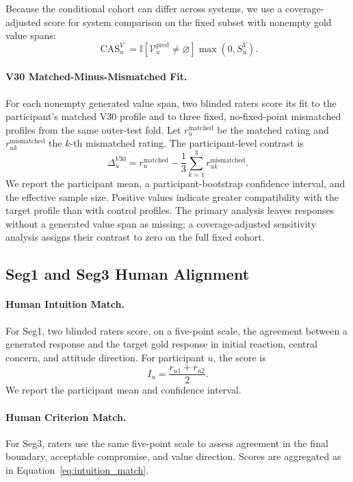 Because the conditional cohort can differ across systems, we use a coverage-adjusted score for system comparison on the fixed subset with nonempty gold value spans:
\begin{equation}
\operatorname{CAS}_u^V=
\mathbb I[\mathcal V_u^{\mathrm{pred}}\ne\varnothing]
\max(0,S_u^V).
\label{eq:coverage_adjusted_value}
\end{equation}

\paragraph{V30 Matched-Minus-Mismatched Fit.}
For each nonempty generated value span, two blinded raters score its fit to the participant's matched V30 profile and to three fixed, no-fixed-point mismatched profiles from the same outer-test fold. Let $r_u^{\mathrm{matched}}$ be the matched rating and $r_{uk}^{\mathrm{mismatched}}$ the $k$-th mismatched rating. The participant-level contrast is
\begin{equation}
\Delta_u^{V30}
=r_u^{\mathrm{matched}}
-\frac{1}{3}\sum_{k=1}^{3}r_{uk}^{\mathrm{mismatched}}.
\label{eq:v30_matched_margin}
\end{equation}
We report the participant mean, a participant-bootstrap confidence interval, and the effective sample size. Positive values indicate greater compatibility with the target profile than with control profiles. The primary analysis leaves responses without a generated value span as missing; a coverage-adjusted sensitivity analysis assigns their contrast to zero on the full fixed cohort.

\subsection{Seg1 and Seg3 Human Alignment}

\paragraph{Human Intuition Match.}
For Seg1, two blinded raters score, on a five-point scale, the agreement between a generated response and the target gold response in initial reaction, central concern, and attitude direction. For participant $u$, the score is
\begin{equation}
I_u=\frac{r_{u1}+r_{u2}}{2}.
\label{eq:intuition_match}
\end{equation}
We report the participant mean and confidence interval.

\paragraph{Human Criterion Match.}
For Seg3, raters use the same five-point scale to assess agreement in the final boundary, acceptable compromise, and value direction. Scores are aggregated as in Equation~\ref{eq:intuition_match}.

